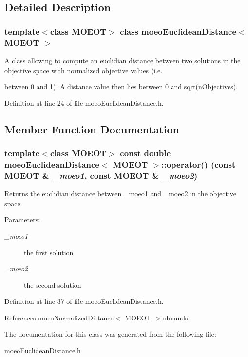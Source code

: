 \subsection{Detailed Description}
\subsubsection*{template$<$class MOEOT$>$ class moeo\-Euclidean\-Distance$<$ MOEOT $>$}

A class allowing to compute an euclidian distance between two solutions in the objective space with normalized objective values (i.e. 

between 0 and 1). A distance value then lies between 0 and sqrt(n\-Objectives). 



Definition at line 24 of file moeo\-Euclidean\-Distance.h.

\subsection{Member Function Documentation}
\subsubsection{\setlength{\rightskip}{0pt plus 5cm}template$<$class MOEOT$>$ const double \bf{moeo\-Euclidean\-Distance}$<$ MOEOT $>$::operator() (const MOEOT \& {\em \_\-moeo1}, const MOEOT \& {\em \_\-moeo2})\hspace{0.3cm}{\tt  [inline]}}\label{classmoeoEuclideanDistance_20ff559e95da92a46990eb0658f018f1}


Returns the euclidian distance between \_\-moeo1 and \_\-moeo2 in the objective space. 

\begin{Desc}
\item[Parameters:]
\begin{description}
\item[{\em \_\-moeo1}]the first solution \item[{\em \_\-moeo2}]the second solution \end{description}
\end{Desc}


Definition at line 37 of file moeo\-Euclidean\-Distance.h.

References moeo\-Normalized\-Distance$<$ MOEOT $>$::bounds.

The documentation for this class was generated from the following file:\begin{CompactItemize}
\item 
moeo\-Euclidean\-Distance.h\end{CompactItemize}
